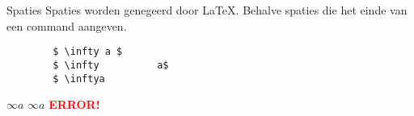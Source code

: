 \begin{frame}[fragile]{Spaties}
    Spaties worden genegeerd door LaTeX. Behalve spaties die het einde van een command aangeven.

    \begin{verbatim}
        $ \infty a $
        $ \infty          a$
        $ \inftya
    \end{verbatim}
    \begin{tcolorbox}[width=11cm]
        $\infty a$ \newline
        $\infty a$ \newline
        \textbf{\textcolor{red}{ERROR!}}
    \end{tcolorbox}
\end{frame}